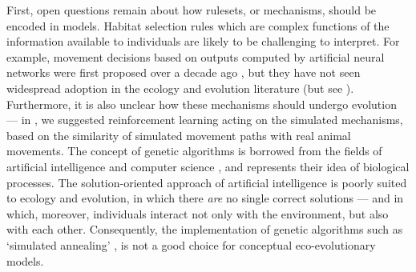 First, open questions remain about how rulesets, or mechanisms, should be encoded in models.
Habitat selection rules which are complex functions of the information available to individuals are likely to be challenging to interpret.
For example, movement decisions based on outputs computed by artificial neural networks were first proposed over a decade ago \parencite{mueller2011}, but they have not seen widespread adoption in the ecology and evolution literature (but see \cite{netz2021}).
Furthermore, it is also unclear how these mechanisms should undergo evolution --- in \textcite{nathan2022}, we suggested reinforcement learning acting on the simulated mechanisms, based on the similarity of simulated movement paths with real animal movements.
The concept of genetic algorithms is borrowed from the fields of artificial intelligence and computer science \parencite{deangelis2019}, and represents their idea of biological processes.
The solution-oriented approach of artificial intelligence is poorly suited to ecology and evolution, in which there \textit{are} no single correct solutions --- and in which, moreover, individuals interact not only with the environment, but also with each other.
Consequently, the implementation of genetic algorithms such as `simulated annealing' \parencite{getz2015}, is not a good choice for conceptual eco-evolutionary models.

